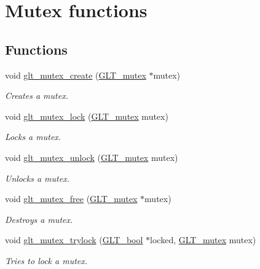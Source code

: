 \hypertarget{group__MUTEX}{\section{Mutex functions}
\label{group__MUTEX}
}
\subsection*{Functions}
\begin{DoxyCompactItemize}
\item 
void \hyperlink{group__MUTEX_ga2f230615e4d7f09011f7222b4ad0bb25}{glt\-\_\-mutex\-\_\-create} (\hyperlink{group__OBJECTS_ga17fa54e8d474f0313c629c34c119f0c8}{G\-L\-T\-\_\-mutex} $\ast$mutex)
\begin{DoxyCompactList}\small\item\em Creates a mutex. \end{DoxyCompactList}\item 
void \hyperlink{group__MUTEX_ga337c654c561a5f8a6f7c2dd0a7012650}{glt\-\_\-mutex\-\_\-lock} (\hyperlink{group__OBJECTS_ga17fa54e8d474f0313c629c34c119f0c8}{G\-L\-T\-\_\-mutex} mutex)
\begin{DoxyCompactList}\small\item\em Locks a mutex. \end{DoxyCompactList}\item 
void \hyperlink{group__MUTEX_gad18039d55ed2b243ef1a8904f2bf4082}{glt\-\_\-mutex\-\_\-unlock} (\hyperlink{group__OBJECTS_ga17fa54e8d474f0313c629c34c119f0c8}{G\-L\-T\-\_\-mutex} mutex)
\begin{DoxyCompactList}\small\item\em Unlocks a mutex. \end{DoxyCompactList}\item 
void \hyperlink{group__MUTEX_ga4e22bebb15e26d508d6283967a0d43f9}{glt\-\_\-mutex\-\_\-free} (\hyperlink{group__OBJECTS_ga17fa54e8d474f0313c629c34c119f0c8}{G\-L\-T\-\_\-mutex} $\ast$mutex)
\begin{DoxyCompactList}\small\item\em Destroys a mutex. \end{DoxyCompactList}\item 
void \hyperlink{group__MUTEX_ga6b91862c97da21affe0adeecceb616ad}{glt\-\_\-mutex\-\_\-trylock} (\hyperlink{group__OBJECTS_ga64121a8c1742a545436e128bcbfd6131}{G\-L\-T\-\_\-bool} $\ast$locked, \hyperlink{group__OBJECTS_ga17fa54e8d474f0313c629c34c119f0c8}{G\-L\-T\-\_\-mutex} mutex)
\begin{DoxyCompactList}\small\item\em Tries to lock a mutex. \end{DoxyCompactList}\end{DoxyCompactItemize}


